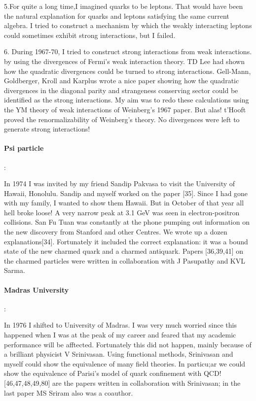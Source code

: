 5.For quite a long time,I imagined quarks to be leptons. That would have 
been the natural explanation for quarks and leptons satisfying the same 
current algebra. I tried to construct a mechanism by which the weakly 
interacting leptons could sometimes exhibit strong interactions, but I 
failed.

6. During 1967-70, I tried to construct strong interactions from weak 
interactions. by using the divergences of Fermi's weak interaction 
theory. TD Lee had shown how the quadratic divergences could be turned 
to strong interactions. Gell-Mann, Goldberger, Kroll and Karplus wrote a 
nice paper showing how the quadratic divergences in the diagonal parity 
and strangeness conserving sector could be identified as the strong 
interactions. My aim was to redo these calculations using the YM theory 
of weak interactions of Weinberg's 1967 paper. But alas! t'Hooft proved 
the renormalizability of Weinberg's theory. No divergences were left to 
generate strong interactions!

\paragraph{Psi particle}:

In 1974 I was invited by my friend Sandip Pakvasa to visit the 
University of Hawaii, Honolulu. Sandip and myself worked on the paper 
[35]. Since I had gone with my family, I wanted to show them Hawaii. But 
in October of that year all hell broke loose! A very narrow peak at 3.1 
GeV was seen in electron-positron collisions. San Fu Tuan was constantly 
at the phone pumping out information on the new discovery from Stanford 
and other Centres. We wrote up a dozen explanations[34]. Fortunately it 
included the correct explanation: it was a bound state of the new 
charmed quark and a charmed antiquark. Papers [36,39,41] on the charmed 
particles were written in collaboration with J Pasupathy and KVL Sarma.

\paragraph{Madras University}:

In 1976 I shifted to University of Madras. I was very much worried since 
this happened when I was at the peak of my career and feared that my 
academic performance will be afftected. Fortunately this did not happen, 
mainly because of a brilliant physicist V Srinivasan. Using functional 
methods, Srinivasan and myself could show the equivalence of many field 
theories. In particu;ar we could show the equivalence of Parisi's model 
of quark confinement with QCD! [46,47,48,49,80] are the papers written 
in collaboration with Srinivasan; in the last paper MS Sriram also was a 
coauthor.

